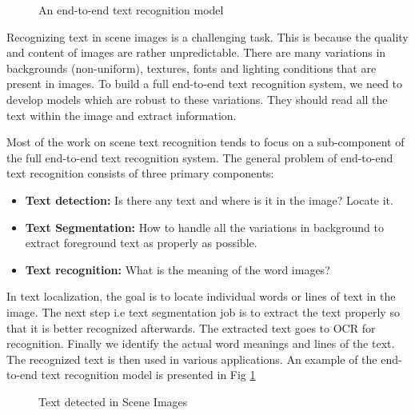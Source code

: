 \begin{figure}[t]
\centering
{}
\caption
{An end-to-end text recognition model}
\label{fig:textmodel}
\end{figure}

Recognizing text in scene images is a challenging task.
This is because the quality and content of images are
rather unpredictable. There are many variations in backgrounds (non-uniform), textures,
fonts and lighting conditions that are present in images.
To build a full end-to-end text recognition system, we need to develop models
which are robust to these variations. They should read all the text within the image and extract information. 
 
Most of the work on scene text recognition tends to focus on a sub-component of the
full end-to-end text recognition system.
The general problem of end-to-end text recognition
consists of three primary components:  

\begin{itemize}
 \item \textbf{Text detection:} Is there any text and where is it in the image? Locate it.
\item \textbf{Text Segmentation:} How to handle all the variations in background to extract 
foreground text as properly as possible.
\item \textbf{Text recognition:} What is the meaning of the word images?
\end{itemize}

In text
localization, the goal is to locate individual words or lines of text in the image.
The next step i.e text segmentation 
job is to extract the text properly so that it is better recognized afterwards. 
The extracted text goes to OCR for recognition.
Finally we identify the actual word meanings and
lines of the text. The recognized text is then used in various applications. 
An example of the end-to-end text recognition model is presented
in Fig \ref{fig:textmodel}


\begin{figure}[t]
\centering
{}
\caption
{Text detected in Scene Images}
\label{fig:detect}
\end{figure}


